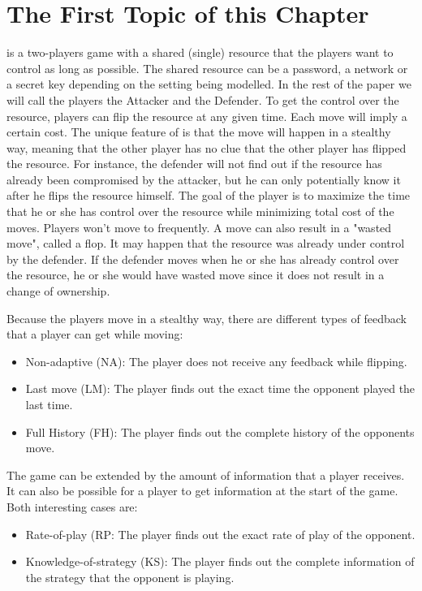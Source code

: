 \section{The First Topic of this Chapter}
 is a two-players game with a shared (single) resource that the players want to control as long as possible. The shared resource can be a password, a network or a secret key depending on the setting being modelled. In the rest of the paper we will call the players the Attacker and the Defender. To get the control over the resource, players can flip the resource at any given time. Each move will imply a certain cost. The unique feature of  is that the move will happen in a stealthy way, meaning that the other player has no clue that the other player has flipped the resource. For instance, the defender will not find out if the resource has already been compromised by the attacker, but he can only potentially know it after he flips the resource himself. The goal of the player is to maximize the time that he or she has control over the resource while minimizing total cost of the moves. Players won't move to frequently. A move can also result in a "wasted move", called a flop. It may happen that the resource was already under control by the defender. If the defender moves when he or she has already control over the resource, he or she would have wasted move since it does not result in a change of ownership. 
 
Because the players move in a stealthy way, there are different types of feedback that a player can get while moving:
\begin{itemize}
\item Non-adaptive (NA): The player does not receive any feedback while flipping.
\item Last move (LM): The player finds out the exact time the opponent played the last time.
\item Full History (FH): The player finds out the complete history of the opponents move.
\end{itemize}
The game can be extended by the amount of information that a player receives. It can also be possible for a player to get information at the start of the game. Both interesting cases are:
\begin{itemize}
\item Rate-of-play (RP: The player finds out the exact rate of play of the opponent.
\item Knowledge-of-strategy (KS): The player finds out the complete information of the strategy that the opponent is playing.
\end{itemize}

